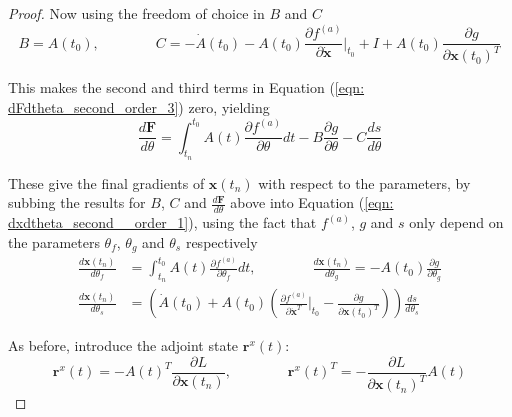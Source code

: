 \documentclass{article}
\theoremstyle{remark}
\theoremstyle{definition}
\begin{document}
\begin{proof}
Now using the freedom of choice in $B$ and $C$
\begin{equation}
    B = A(t_{0}),
    \qquad\qquad
    C = -\dot{A}(t_{0}) -A(t_{0})\frac{\partial f^{(a)}}{\partial \dot{\mathbf{x}}}
    \Biggr\vert_{t_{0}}
    +I
    + A(t_{0})\frac{\partial g}{\partial \mathbf{x}(t_{0})^{T}}
\end{equation}

This makes the second and third terms in Equation (\ref{eqn: dFdtheta_second_order_3}) zero, yielding
\begin{equation}
    \frac{d\mathbf{F}}{d\theta} = 
    \int_{t_{n}}^{t_{0}}A(t)\frac{\partial f^{(a)}}{\partial \theta}dt
    -B\frac{\partial g}{\partial \theta}
    - C\frac{d s}{d \theta}
\end{equation}

These give the final gradients of $\mathbf{x}(t_{n})$ with respect to the parameters, by subbing the results for $B$, $C$ and $\displaystyle  \frac{d\mathbf{F}}{d\theta}$ above into Equation (\ref{eqn: dxdtheta_second__order_1}), using the fact that $f^{(a)}$, $g$ and $s$ only depend on the parameters $\theta_{f}$, $\theta_{g}$ and $\theta_{s}$ respectively
\begin{equation}
\begin{aligned}
    \frac{d\mathbf{x}(t_{n})}{d\theta_{f}} &= \int_{t_{n}}^{t_{0}}A(t)
    \frac{\partial f^{(a)}}{\partial \theta_{f}}dt
    ,\qquad\qquad
    \frac{d\mathbf{x}(t_{n})}{d\theta_{g}} = -A(t_{0})\frac{\partial g}{\partial \theta_{g}}
    \\
    \frac{d\mathbf{x}(t_{n})}{d\theta_{s}} &=  \left(
    \dot{A}(t_{0}) 
    + A(t_{0})
    \left(
    \frac{\partial f^{(a)}}{\partial \dot{\mathbf{x}}^{T}}\Biggr\vert_{t_{0}}
    - \frac{\partial g}{\partial \mathbf{x}(t_{0})^{T}}
    \right)
    \right)\frac{ds}{d\theta_{s}}
\end{aligned}
\end{equation}

As before, introduce the adjoint state $\mathbf{r}^{x}(t)$:
\begin{equation}
    \mathbf{r}^{x}(t) = -A(t)^{T}\frac{\partial L}{\partial \mathbf{x}(t_{n})},
    \qquad\qquad
    \mathbf{r}^{x}(t)^{T} = -\frac{\partial L}{\partial \mathbf{x}(t_{n})^{T}}A(t)
\end{equation}


\end{proof}
\end{document}

